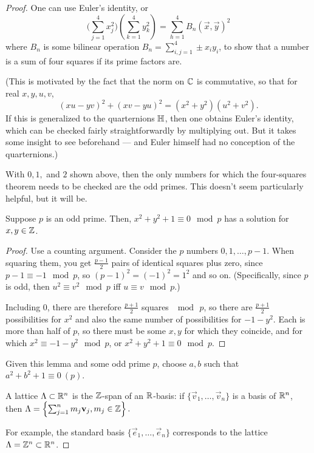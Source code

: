 \begin{proof}
One can use Euler's identity, or
\[
\Bigg(\sum_{j=1}^4 x_j^2\Bigg)\left(\sum_{k=1}^4y_k^2\right) = \sum_{h=1}^4 B_n(\vec x,\vec y)^2
\]
where $B_n$ is some bilinear operation $B_n = \sum_{i,j=1}^4 \pm x_iy_i$, to show that a number is a sum of four squares if its prime factors are.

(This is motivated by the fact that the norm on $\mathbb{C}$ is commutative, so that for real $x,y,u,v$, \[(xu-yv)^2+(xv-yu)^2 = (x^2+y^2)(u^2+v^2).\] If this is generalized to the quarternions $\mathbb{H}$, then one obtains Euler's identity, which can be checked fairly straightforwardly by multiplying out. But it takes some insight to see beforehand --- and Euler himself had no conception of the quarternions.)

With $0,1,$ and $2$ shown above, then the only numbers for which the four-squares theorem needs to be checked are the odd primes. This doesn't seem particularly helpful, but it will be.
\begin{lem}
Suppose $p$ is an odd prime. Then, $x^2+y^2 + 1\equiv 0\mod p$ has a solution for $x,y\in\mathbb{Z}$.
\end{lem}
\begin{proof}
Use a counting argument. Consider the $p$ numbers $0,1,\dots,p-1$. When squaring them, you get $\frac{p-1}{2}$ pairs of identical squares plus zero, since $p-1\equiv -1\mod p$, so $(p-1)^2 = (-1)^2 = 1^2$ and so on. (Specifically, since $p$ is odd, then $u^2\equiv v^2\mod p$ iff $u\equiv v\mod p$.)

Including $0$, there are therefore $\frac{p+1}{2}$ squares $\mod\, p$, so there are $\frac{p+1}{2}$ possibilities for $x^2$ and also the same number of possibilities for $-1-y^2$. Each is more than half of $p$, so there must be some $x,y$ for which they coincide, and for which $x^2\equiv -1-y^2\mod p$, or $x^2+y^2+1\equiv 0\mod p$.
\end{proof}
Given this lemma and some odd prime $p$, choose $a,b$ such that $a^2+b^2+1\equiv 0\ (p)$.
\begin{defn}
A lattice $\Lambda\subset\mathbb{R}^n$ is the $\mathbb{Z}$-span of an $\mathbb{R}$-basis: if $\{\vec v_1,\dots,\vec v_n\}$ is a basis of $\mathbb{R}^n$, then $\Lambda = \left\{\sum_{j=1}^n m_j\mathbf v_j,m_j\in\mathbb{Z}\right\}.$
\end{defn}
For example, the standard basis $\{\vec e_1,\dots,\vec e_n\}$ corresponds to the lattice $\Lambda = \mathbb{Z}^n\subset\mathbb{R}^n$.


\end{proof}
